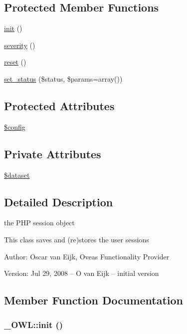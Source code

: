 \subsection*{Protected Member Functions}
\begin{CompactItemize}
\item 
\hyperlink{class__OWL_e0ef3ded56e8a6b34b6461e5a721cd3e}{init} ()
\item 
\hyperlink{class__OWL_5b88d497ccf2305fa411b9bd3f4bfe6f}{severity} ()
\item 
\hyperlink{class__OWL_2f2a042bcf31965194c03033df0edc9b}{reset} ()
\item 
\hyperlink{class__OWL_ea912d0ede9b3c2a69b79072d94d4787}{set\_\-status} (\$status, \$params=array())
\end{CompactItemize}
\subsection*{Protected Attributes}
\begin{CompactItemize}
\item 
\hyperlink{class__OWL_f37a011667dda12fc417a68a6f3077d1}{\$config}
\end{CompactItemize}
\subsection*{Private Attributes}
\begin{CompactItemize}
\item 
\hyperlink{classSessionHandler_74c46fcfbadd4c4e6bacc73ddf350056}{\$dataset}
\end{CompactItemize}


\subsection{Detailed Description}
the PHP session object 

This class saves and (re)stores the user sessions \begin{Desc}
\item[Author:]Oscar van Eijk, Oveas Functionality Provider \end{Desc}
\begin{Desc}
\item[Version:]Jul 29, 2008 -- O van Eijk -- initial version \end{Desc}


\subsection{Member Function Documentation}
\hypertarget{class__OWL_e0ef3ded56e8a6b34b6461e5a721cd3e}{
\subsubsection{\setlength{\rightskip}{0pt plus 5cm}\_\-OWL::init ()}}
\label{class__OWL_e0ef3ded56e8a6b34b6461e5a721cd3e}


